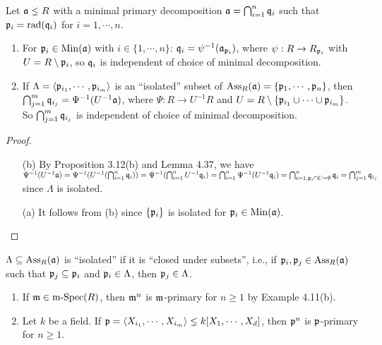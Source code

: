 \begin{theorem}
    Let $\mathfrak{a} \lneq R$ with a minimal primary decomposition $\mathfrak{a} = \bigcap_{i=1}^{n} \mathfrak{q}_i$ such that $\mathfrak{p}_i = \operatorname{rad}(\mathfrak{q}_i)$ for $i = 1,\cdots,n$. 
    \begin{enumerate}
        \item For $\mathfrak{p}_i \in \operatorname{Min}(\mathfrak{a})$ with $i \in \{1,\cdots,n\}$: $\mathfrak{q}_i = \psi^{-1}(\mathfrak{a}_{\mathfrak{p}_i})$, where $\psi: R \to R_{\mathfrak{p}_i}$ with $U = R \setminus \mathfrak{p}_i$, so $\mathfrak{q}_i$ is independent of choice of minimal decomposition.
        \item If $\Lambda = \langle \mathfrak{p}_{i_1},\cdots,\mathfrak{p}_{i_m} \rangle$ is an ``isolated'' subset of $\operatorname{Ass}_R(\mathfrak{a}) = \{\mathfrak{p}_1,\cdots,\mathfrak{p}_n\}$, then $\bigcap_{j=1}^{m} \mathfrak{q}_{i_j} = \Psi^{-1}(U^{-1}\mathfrak{a})$, where $\Psi: R \to U^{-1}R$ and $U = R \setminus \{\mathfrak{p}_{i_1} \cup \cdots \cup \mathfrak{p}_{i_m}\}$. So $\bigcap_{j=1}^{m}\mathfrak{q}_{i_j}$ is independent of choice of minimal decomposition.
    \end{enumerate}
\end{theorem}

\begin{proof}
    \begin{enumerate}
        \item [(b)] By Proposition 3.12(b) and Lemma 4.37, we have $\Psi^{-1}(U^{-1}\mathfrak{a}) = \Psi^{-1}(U^{-1}(\bigcap_{i=1}^{n}\mathfrak{q}_i)) = \Psi^{-1}(\bigcap_{i=1}^{n}U^{-1}\mathfrak{q}_i) = \bigcap_{i=1}^{n} \Psi^{-1}(U^{-1}\mathfrak{q}_i) = \bigcap_{i=1,\mathfrak{p}_i \cap U = \emptyset}^{n} \mathfrak{q}_i = \bigcap_{j=1}^{m} \mathfrak{q}_{i_j}$ since $\Lambda$ is isolated.
        \item [(a)] It follows from (b) since $\{\mathfrak{p}_i\}$ is isolated for $\mathfrak{p}_i \in \operatorname{Min}(\mathfrak{a})$. \qedhere
    \end{enumerate}
\end{proof}

\begin{definition}
    $\Lambda \subseteq \operatorname{Ass}_R(\mathfrak{a})$ is ``isolated'' if it is ``closed under subsets'', i.e., if $\mathfrak{p}_i, \mathfrak{p}_j \in \operatorname{Ass}_R(\mathfrak{a})$ such that $\mathfrak{p}_j \subseteq \mathfrak{p}_i$ and $\mathfrak{p}_i \in \Lambda$, then $\mathfrak{p}_j \in \Lambda$.
\end{definition}

\begin{discussion}
    \begin{enumerate}
        \item
            If $\mathfrak{m} \in \operatorname{m-Spec}(R)$, then $\mathfrak{m}^{n}$ is $\mathfrak{m}$-primary for $n \geq 1$ by Example 4.11(b). \par 
        \item 
            Let $k$ be a field. If $\mathfrak{p} = \langle X_{i_1}, \cdots, X_{i_m} \rangle \lneq k[X_1,\cdots,X_d]$, then $\mathfrak{p}^{n}$ is $\mathfrak{p}$-primary for $n \geq 1$.
    \end{enumerate}
\end{discussion}

